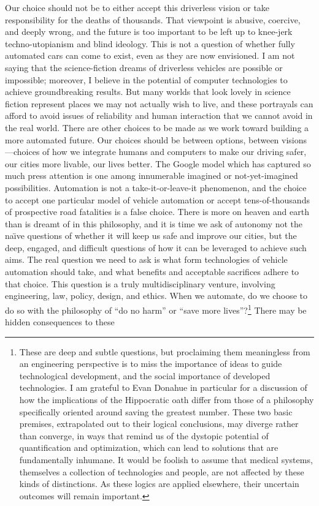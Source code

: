 Our choice should not be to either accept this driverless vision or take
responsibility for the deaths of thousands. That viewpoint is abusive, coercive,
and deeply wrong, and the future is too important to be left up to
knee-jerk techno-utopianism and blind ideology. This is not a question
of whether fully automated cars can come to exist, even as they are
now envisioned. I am not saying that the science-fiction dreams of
driverless vehicles are possible or impossible; moreover, I believe in the
potential of computer technologies to achieve groundbreaking results.
But many worlds that look lovely in science fiction represent places
we may not actually wish to live, and these portrayals can afford to
avoid issues of reliability and human interaction that we cannot avoid
in the real world. There are other choices to be made as we work toward building a
more automated future. Our choices should be between options, between
visions---choices of how we integrate humans and computers to make our
driving safer, our cities more livable, our lives better. The Google model which has
captured so much press attention is one among innumerable imagined or
not-yet-imagined possibilities. Automation is not a
take-it-or-leave-it phenomenon, and the choice to accept one
particular model of vehicle automation or accept tens-of-thousands of
prospective road fatalities is a false choice. There is more on heaven
and earth than is dreamt of in this philosophy, and it is time we ask
of autonomy not the na\"{\i}ve questions of whether it will keep us
safe and improve our cities, but the deep, engaged, and difficult
questions of how it can be leveraged to achieve such aims. The real
question we need to ask is what form technologies of vehicle automation 
should take, and what benefits and acceptable sacrifices adhere to
that choice. This question is a truly multidisciplinary venture,
involving engineering, law, policy, design, and ethics. When we
automate, do we choose to do so with the philosophy of ``do no harm''
or ``save more lives''?\footnote{These are deep and subtle questions,
  but proclaiming them meaningless from an engineering perspective is
  to miss the importance of ideas to guide technological development,
  and the social importance of developed technologies. I am grateful
  to Evan Donahue in particular for a discussion of how the
  implications of the Hippocratic oath differ from those of a
  philosophy specifically oriented around saving the greatest number.
  These two basic premises, extrapolated out to their logical
  conclusions, may diverge rather than converge, in ways that remind
  us of the dystopic potential of quantification and optimization,
  which can lead to solutions that are fundamentally inhumane. It
  would be foolish 
  to assume that medical systems, themselves a collection of
  technologies and people, are not affected by these kinds of
  distinctions. As these logics are applied elsewhere, their uncertain
  outcomes
  will remain important.} There may be hidden consequences to these 
